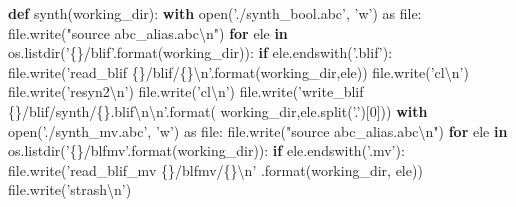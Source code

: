 \documentclass[italian,]{book}
\newenvironment{Shaded}{\begin{snugshade}}{\end{snugshade}}
\newcommand{\BuiltInTok}[1]{#1}
\newcommand{\CharTok}[1]{\textcolor[rgb]{0.31,0.60,0.02}{#1}}
\newcommand{\ControlFlowTok}[1]{\textcolor[rgb]{0.13,0.29,0.53}{\textbf{#1}}}
\newcommand{\DecValTok}[1]{\textcolor[rgb]{0.00,0.00,0.81}{#1}}
\newcommand{\ImportTok}[1]{#1}
\newcommand{\KeywordTok}[1]{\textcolor[rgb]{0.13,0.29,0.53}{\textbf{#1}}}
\newcommand{\NormalTok}[1]{#1}
\newcommand{\SpecialCharTok}[1]{\textcolor[rgb]{0.00,0.00,0.00}{#1}}
\newcommand{\StringTok}[1]{\textcolor[rgb]{0.31,0.60,0.02}{#1}}
\begin{document}
\begin{Shaded}
\begin{Highlighting}[]
\KeywordTok{def}\NormalTok{ synth(working_dir):  }
  \ControlFlowTok{with} \BuiltInTok{open}\NormalTok{(}\StringTok{'./synth_bool.abc'}\NormalTok{, }\StringTok{'w'}\NormalTok{) }\ImportTok{as} \BuiltInTok{file}\NormalTok{:}
    \BuiltInTok{file}\NormalTok{.write(}\StringTok{"source abc_alias.abc}\CharTok{\textbackslash{}n}\StringTok{"}\NormalTok{)}
    \ControlFlowTok{for}\NormalTok{ ele }\KeywordTok{in}\NormalTok{ os.listdir(}\StringTok{'}\SpecialCharTok{\{\}}\StringTok{/blif'}\NormalTok{.}\BuiltInTok{format}\NormalTok{(working_dir)):}
      \ControlFlowTok{if}\NormalTok{ ele.endswith(}\StringTok{'.blif'}\NormalTok{):}
        \BuiltInTok{file}\NormalTok{.write(}\StringTok{'read_blif }\SpecialCharTok{\{\}}\StringTok{/blif/}\SpecialCharTok{\{\}}\CharTok{\textbackslash{}n}\StringTok{'}\NormalTok{.}\BuiltInTok{format}\NormalTok{(working_dir,ele))}
        \BuiltInTok{file}\NormalTok{.write(}\StringTok{'cl}\CharTok{\textbackslash{}n}\StringTok{'}\NormalTok{)}
        \BuiltInTok{file}\NormalTok{.write(}\StringTok{'resyn2}\CharTok{\textbackslash{}n}\StringTok{'}\NormalTok{)}
        \BuiltInTok{file}\NormalTok{.write(}\StringTok{'cl}\CharTok{\textbackslash{}n}\StringTok{'}\NormalTok{)}
        \BuiltInTok{file}\NormalTok{.write(}\StringTok{'write_blif }\SpecialCharTok{\{\}}\StringTok{/blif/synth/}\SpecialCharTok{\{\}}\StringTok{.blif}\CharTok{\textbackslash{}n\textbackslash{}n}\StringTok{'}\NormalTok{.}\BuiltInTok{format}\NormalTok{(}
\NormalTok{          working_dir,ele.split(}\StringTok{'.'}\NormalTok{)[}\DecValTok{0}\NormalTok{]))}
  \ControlFlowTok{with} \BuiltInTok{open}\NormalTok{(}\StringTok{'./synth_mv.abc'}\NormalTok{, }\StringTok{'w'}\NormalTok{) }\ImportTok{as} \BuiltInTok{file}\NormalTok{:}
    \BuiltInTok{file}\NormalTok{.write(}\StringTok{"source abc_alias.abc}\CharTok{\textbackslash{}n}\StringTok{"}\NormalTok{)}
    \ControlFlowTok{for}\NormalTok{ ele }\KeywordTok{in}\NormalTok{ os.listdir(}\StringTok{'}\SpecialCharTok{\{\}}\StringTok{/blfmv'}\NormalTok{.}\BuiltInTok{format}\NormalTok{(working_dir)):}
      \ControlFlowTok{if}\NormalTok{ ele.endswith(}\StringTok{'.mv'}\NormalTok{):}
        \BuiltInTok{file}\NormalTok{.write(}\StringTok{'read_blif_mv }\SpecialCharTok{\{\}}\StringTok{/blfmv/}\SpecialCharTok{\{\}}\CharTok{\textbackslash{}n}\StringTok{'}
\NormalTok{          .}\BuiltInTok{format}\NormalTok{(working_dir, ele))}
        \BuiltInTok{file}\NormalTok{.write(}\StringTok{'strash}\CharTok{\textbackslash{}n}\StringTok{'}\NormalTok{)}

\end{Highlighting}
\end{Shaded}
\end{document}
